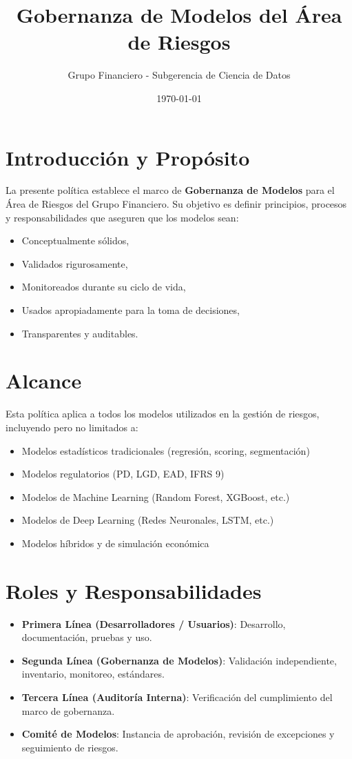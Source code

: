 \documentclass[12pt]{article}
\title{\textbf{Gobernanza de Modelos del Área de Riesgos}}
\author{Grupo Financiero - Subgerencia de Ciencia de Datos}
\date{\today}
\begin{document}
\maketitle

\tableofcontents

\newpage

\section{Introducción y Propósito}
La presente política establece el marco de \textbf{Gobernanza de Modelos} para el Área de Riesgos del Grupo Financiero. Su objetivo es definir principios, procesos y responsabilidades que aseguren que los modelos sean:
\begin{itemize}
  \item Conceptualmente sólidos,
  \item Validados rigurosamente,
  \item Monitoreados durante su ciclo de vida,
  \item Usados apropiadamente para la toma de decisiones,
  \item Transparentes y auditables.
\end{itemize}

\section{Alcance}
Esta política aplica a todos los modelos utilizados en la gestión de riesgos, incluyendo pero no limitados a:
\begin{itemize}
  \item Modelos estadísticos tradicionales (regresión, scoring, segmentación)
  \item Modelos regulatorios (PD, LGD, EAD, IFRS 9)
  \item Modelos de Machine Learning (Random Forest, XGBoost, etc.)
  \item Modelos de Deep Learning (Redes Neuronales, LSTM, etc.)
  \item Modelos híbridos y de simulación económica
\end{itemize}

\section{Roles y Responsabilidades}
\begin{itemize}
  \item \textbf{Primera Línea (Desarrolladores / Usuarios)}: Desarrollo, documentación, pruebas y uso.
  \item \textbf{Segunda Línea (Gobernanza de Modelos)}: Validación independiente, inventario, monitoreo, estándares.
  \item \textbf{Tercera Línea (Auditoría Interna)}: Verificación del cumplimiento del marco de gobernanza.
  \item \textbf{Comité de Modelos}: Instancia de aprobación, revisión de excepciones y seguimiento de riesgos.
\end{itemize}
\end{document}
